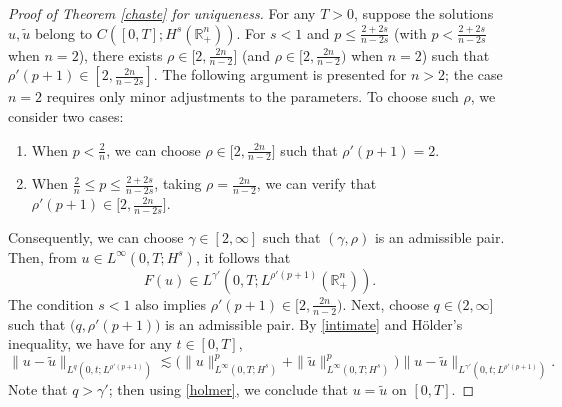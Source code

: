 \documentclass[preprint,compress,12pt]{elsarticle}
\numberwithin{equation}{section}
\begin{document}
\begin{proof}[Proof of Theorem \ref{chaste} for uniqueness]
	For any $T>0$, suppose the solutions $u,\tilde{u}$ belong to $C\left([0,T];H^{s}(\mathbb{R}^{n}_{+})\right)$.	For $s<1$ and $p\leq \frac{2+2s}{n-2s}$ (with $p<\frac{2+2s}{n-2s}$ when $n=2$), there exists $\rho\in \big[2,\frac{2n}{n-2}\big]$ (and $\rho\in\big[2,\frac{2n}{n-2}\big)$ when $n=2$) such that $
	\rho'(p+1) \in \left[2, \frac{2n}{n-2s}\right]$. The following argument is presented for $n>2$; the case $n=2$ requires only minor adjustments to the parameters. To choose such $\rho$, we consider two cases:
	\begin{enumerate}[label=(\roman*)]
		\item When $p < \frac{2}{n}$, we can choose $\rho \in \big[2, \frac{2n}{n-2}\big]$ such that $\rho'(p+1) = 2$.
		\item When $\frac{2}{n} \leq p \leq \frac{2+2s}{n-2s}$, taking $\rho = \frac{2n}{n-2}$, we can verify that $\rho'(p+1) \in \big[2, \frac{2n}{n-2s}\big]$.
	\end{enumerate}
	Consequently, we can choose $\gamma \in [2, \infty]$ such that $(\gamma, \rho)$ is an admissible pair. Then, from $u \in L^{\infty}(0, T; H^{s})$, it follows that
	\begin{equation*}
		F(u) \in L^{\gamma'}(0, T; L^{\rho'(p+1)}(\mathbb{R}^{n}_{+})).
	\end{equation*}
	The condition $s < 1$ also implies $\rho'(p+1) \in \big[2, \frac{2n}{n-2}\big)$. Next, choose $q \in (2, \infty]$ such that $\big(q, \rho'(p+1)\big)$ is an admissible pair. By  \eqref{intimate} and H\"{o}lder's inequality, we have for any $t\in[0,T]$,
	\begin{equation}
		\|u - \tilde{u}\|_{L^{q}(0, t; L^{\rho'(p+1)})} \lesssim \big( \|u\|_{L^{\infty}(0, T; H^{s})}^{p} + \|\tilde{u}\|_{L^{\infty}(0, T; H^{s})}^{p} \big) \|u - \tilde{u}\|_{L^{\gamma'}(0, t; L^{\rho'(p+1)})}.
	\end{equation}
	Note that $q > \gamma'$; then using \eqref{holmer}, we conclude that $u = \tilde{u}$ on $[0, T]$.
	

\end{proof}
\end{document}
